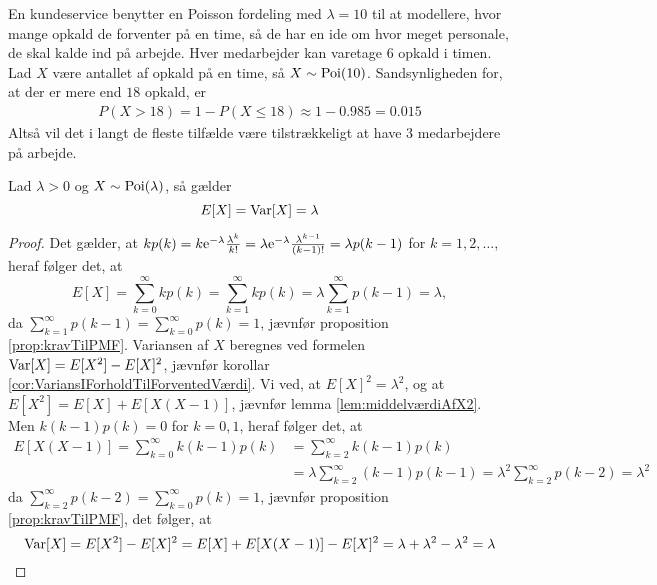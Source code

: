 \begin{exmp}\label{exmp:kundeservice}
En kundeservice benytter en Poisson fordeling med $\lambda = 10$ til at modellere, hvor mange opkald de forventer på en time, så de har en ide om hvor meget personale, de skal kalde ind på arbejde. Hver medarbejder kan varetage $6$ opkald i timen. Lad $X$ være antallet af opkald på en time, så $X \sim \textnormal{Poi}(10)$.
Sandsynligheden for, at der er mere end $18$ opkald, er
\begin{align*}
    P(X > 18) = 1 - P(X \leq 18) \approx 1 - 0.985 = 0.015
\end{align*}
Altså vil det i langt de fleste tilfælde være tilstrækkeligt at have 3 medarbejdere på arbejde. 
\end{exmp}
\begin{prop}\label{prop:poiForventedOgVarians} %
Lad $\lambda > 0$ og $X \sim \textnormal{Poi}(\lambda)$, så gælder
\begin{equation*}
    E[X] = \textnormal{Var}[X] = \lambda
\end{equation*}
\end{prop}
\begin{proof}
Det gælder, at $kp(k) = k \mathrm{e}^{-\lambda} \frac{\lambda^k}{k!} = \lambda \mathrm{e}^{-\lambda} \frac{\lambda^{k - 1}}{(k - 1)!} = \lambda p(k - 1)$ for $k = 1, 2, \ldots$, heraf følger det, at 
\begin{equation*}
    E[X] = \sum^\infty_{k = 0} k p(k) = \sum^\infty_{k = 1} k p(k) = \lambda \sum^\infty_{k = 1} p(k - 1) = \lambda,
\end{equation*}
da $\sum^\infty_{k = 1} p(k - 1) = \sum^\infty_{k = 0} p(k) =  1$, jævnfør proposition \ref{prop:kravTilPMF}.
Variansen af $X$ beregnes ved formelen $\textnormal{Var}[X] = E[X^2] - E[X]^2$, jævnfør korollar \ref{cor:VariansIForholdTilForventedVærdi}. Vi ved, at $E[X]^2 = \lambda^2$, og at $E[X^2] = E[X] + E[X(X - 1)]$, jævnfør lemma \ref{lem:middelværdiAfX2}. Men $k(k - 1)p(k) = 0$ for $k = 0, 1$, heraf følger det, at
\begin{align*}
    E[X(X-1)] = \sum^{\infty}_{k = 0} k (k - 1) p(k)
    &= \sum^\infty_{k = 2} k(k - 1) p(k) \\ &=  \lambda\sum^\infty_{k = 2} (k - 1) p(k - 1) =\lambda^2 \sum^\infty_{k = 2} p(k - 2) = \lambda^2
\end{align*}
da $\sum^\infty_{k = 2} p(k - 2) = \sum^\infty_{k = 0} p(k) = 1$, jævnfør proposition \ref{prop:kravTilPMF}, det følger, at 
\begin{equation*}
    \textnormal{Var}[X] = E[X^2] - E[X]^2 = E[X] + E[X(X - 1)] - E[X]^2 = \lambda + \lambda^2 - \lambda^2 = \lambda
\end{equation*}
\end{proof}
